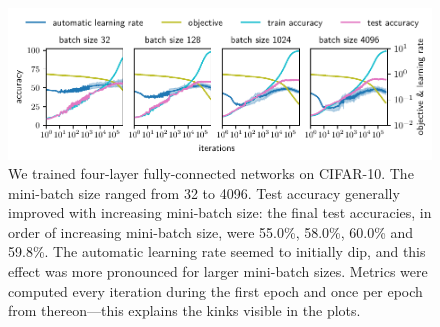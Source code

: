\begin{figure}
    \centering
    \includegraphics[width=\textwidth]{figures/pdf/plot4}
    \caption{ We trained four-layer fully-connected networks on CIFAR-10. The mini-batch size ranged from 32 to 4096. Test accuracy generally improved with increasing mini-batch size: the final test accuracies, in order of increasing mini-batch size, were 55.0\%, 58.0\%, 60.0\% and 59.8\%. The automatic learning rate seemed to initially dip, and this effect was more pronounced for larger mini-batch sizes. Metrics were computed every iteration during the first epoch and once per epoch from thereon---this explains the kinks visible in the plots.
    } \label{fig:4}
\end{figure}